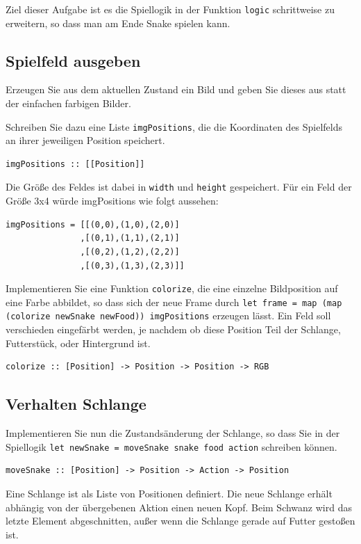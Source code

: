 \documentclass{scrartcl}
\begin{document}
Ziel dieser Aufgabe ist es die Spiellogik in der Funktion \texttt{logic} schrittweise zu erweitern, so dass man am Ende Snake spielen kann.

\subsection{Spielfeld ausgeben}
Erzeugen Sie aus dem aktuellen Zustand ein Bild und geben Sie dieses aus statt der einfachen farbigen Bilder.

Schreiben Sie dazu eine Liste \texttt{imgPositions}, die die Koordinaten des Spielfelds an ihrer jeweiligen Position speichert.

\begin{lstlisting}
imgPositions :: [[Position]]
\end{lstlisting}

Die Größe des Feldes ist dabei in \texttt{width} und \texttt{height} gespeichert.
Für ein Feld der Größe 3x4 würde imgPositions wie folgt aussehen:

\begin{lstlisting}
imgPositions = [[(0,0),(1,0),(2,0)]
               ,[(0,1),(1,1),(2,1)]
               ,[(0,2),(1,2),(2,2)]
               ,[(0,3),(1,3),(2,3)]]
\end{lstlisting}

Implementieren Sie eine Funktion \texttt{colorize}, die eine einzelne Bildposition auf eine Farbe abbildet, so dass sich der neue Frame durch \texttt{let frame = map (map (colorize newSnake newFood)) imgPositions} erzeugen lässt.
Ein Feld soll verschieden eingefärbt werden, je nachdem ob diese Position Teil der Schlange, Futterstück, oder Hintergrund ist.

\begin{lstlisting}
colorize :: [Position] -> Position -> Position -> RGB
\end{lstlisting}

\subsection{Verhalten Schlange}
Implementieren Sie nun die Zustandsänderung der Schlange, so dass Sie in der Spiellogik \texttt{let newSnake = moveSnake snake food action} schreiben können.

\begin{lstlisting}
moveSnake :: [Position] -> Position -> Action -> Position
\end{lstlisting}

Eine Schlange ist als Liste von Positionen definiert.
Die neue Schlange erhält abhängig von der übergebenen Aktion einen neuen Kopf.
Beim Schwanz wird das letzte Element abgeschnitten, außer wenn die Schlange gerade auf Futter gestoßen ist.
\end{document}
